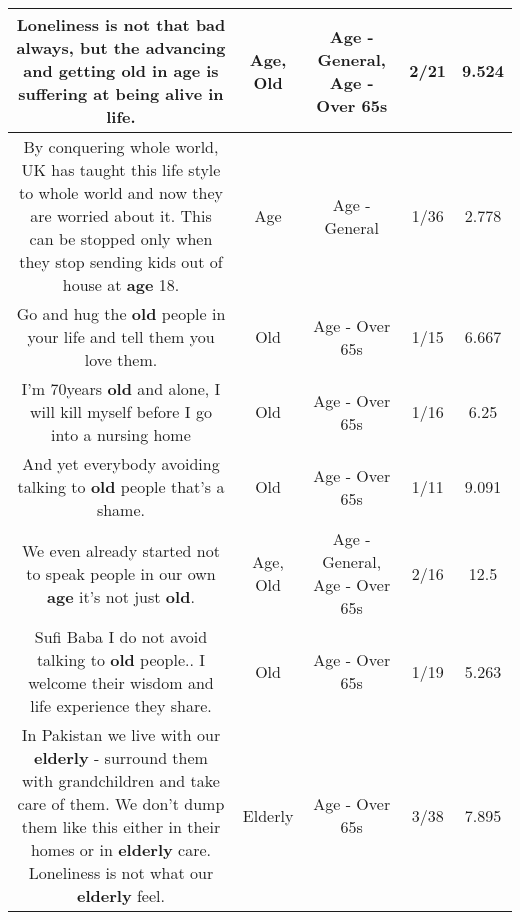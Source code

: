 \documentclass[11pt]{article}
\newlength\mylength
\begin{document}
\begin{center}
\begin{longtable}{|C{.65\mylength}|C{.30\mylength}|C{.12\mylength}|C{.12\mylength}|C{.12\mylength}|}
  \small Loneliness is not that bad always, but the advancing and getting \textbf{old} in \textbf{age} is suffering at being alive in life.\normalsize   & Age, Old & Age - General, Age - Over 65s & 2/21 & 9.524 \\  \hline
  \small By conquering whole world, UK has taught this life style to whole world and now they are worried about it. This can be stopped only when they stop sending kids out of house at \textbf{age} 18.\normalsize   & Age & Age - General & 1/36 & 2.778 \\  \hline
  \small Go and hug the \textbf{old} people in your life and tell them you love them.\normalsize   & Old & Age - Over 65s & 1/15 & 6.667 \\  \hline
  \small I'm 70years \textbf{old} and alone, I will kill myself before I go into a nursing home\normalsize   & Old & Age - Over 65s & 1/16 & 6.25 \\  \hline
  \small And yet everybody avoiding talking to \textbf{old} people that's a shame.\normalsize   & Old & Age - Over 65s & 1/11 & 9.091 \\  \hline
  \small We even already started not to speak people in our own \textbf{age} it's not just \textbf{old}.\normalsize   & Age, Old & Age - General, Age - Over 65s & 2/16 & 12.5 \\  \hline
  \small Sufi Baba I do not avoid talking to \textbf{old} people.. I welcome their wisdom and life experience they share.\normalsize   & Old & Age - Over 65s & 1/19 & 5.263 \\  \hline
  \small In Pakistan we live with our \textbf{elderly} - surround them with grandchildren and take care of them. We don't dump them like this either in their homes or in \textbf{elderly} care. Loneliness is not what our \textbf{elderly} feel.\normalsize   & Elderly & Age - Over 65s & 3/38 & 7.895 \\  \hline

\end{longtable}
\end{center}
\end{document}
